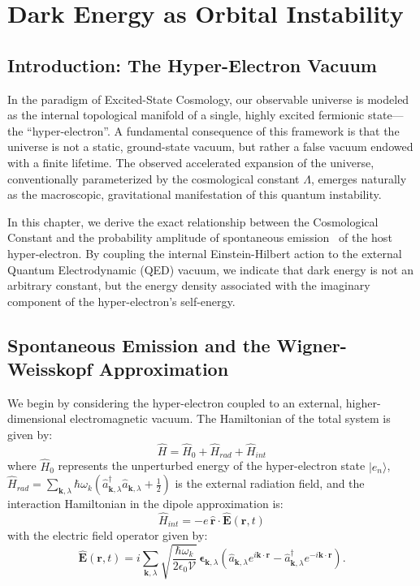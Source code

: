 \section{Dark Energy as Orbital Instability}
\label{ch:dark_energy_instability}

\subsection{Introduction: The Hyper-Electron Vacuum}

In the paradigm of Excited-State Cosmology, our observable universe is modeled as the internal topological manifold of a single, highly excited fermionic state---the ``hyper-electron''. A fundamental consequence of this framework is that the universe is not a static, ground-state vacuum, but rather a false vacuum endowed with a finite lifetime. The observed accelerated expansion of the universe, conventionally parameterized by the cosmological constant $\Lambda$, emerges naturally as the macroscopic, gravitational manifestation of this quantum instability. \cite{Bekenstein2004, Clowe2006, Walker1936}

In this chapter, we derive the exact relationship between the Cosmological Constant and the probability amplitude of spontaneous emission~\cite{Weisskopf1930} of the host hyper-electron. By coupling the internal Einstein-Hilbert action to the external Quantum Electrodynamic (QED) vacuum, we indicate that dark energy is not an arbitrary constant, but the energy density associated with the imaginary component of the hyper-electron's self-energy.

\subsection{Spontaneous Emission and the Wigner-Weisskopf Approximation}

We begin by considering the hyper-electron coupled to an external, higher-dimensional electromagnetic vacuum. The Hamiltonian of the total system is given by:
\begin{equation}
    \hat{H} = \hat{H}_0 + \hat{H}_{rad} + \hat{H}_{int}
\end{equation}
where $\hat{H}_0$ represents the unperturbed energy of the hyper-electron state $|e_n\rangle$, $\hat{H}_{rad} = \sum_{\mathbf{k},\lambda} \hbar \omega_k \left( \hat{a}_{\mathbf{k},\lambda}^\dagger \hat{a}_{\mathbf{k},\lambda} + \frac{1}{2} \right)$ is the external radiation field, and the interaction Hamiltonian in the dipole approximation is:
\begin{equation}
    \hat{H}_{int} = -e \, \hat{\mathbf{r}} \cdot \hat{\mathbf{E}}(\mathbf{r}, t)
\end{equation}
with the electric field operator given by:
\begin{equation}
    \hat{\mathbf{E}}(\mathbf{r}, t) = i \sum_{\mathbf{k},\lambda} \sqrt{\frac{\hbar \omega_k}{2 \epsilon_0 \mathcal{V}}} \, \mathbf{\epsilon}_{\mathbf{k},\lambda} \left( \hat{a}_{\mathbf{k},\lambda} e^{i\mathbf{k}\cdot\mathbf{r}} - \hat{a}_{\mathbf{k},\lambda}^\dagger e^{-i\mathbf{k}\cdot\mathbf{r}} \right).
\end{equation}


